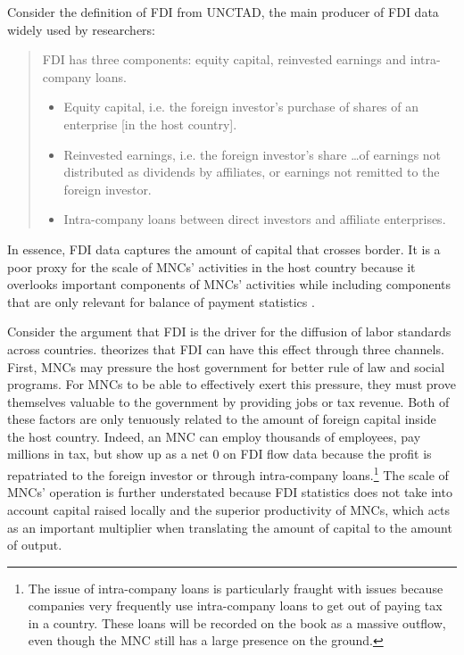 Consider the definition of FDI from UNCTAD, the main producer of FDI data widely
used by researchers:

\begin{quote} FDI has three components: equity capital, reinvested earnings and
  intra-company loans.
  \begin{itemize}
  \item Equity capital, i.e. the foreign investor’s purchase of shares of an
    enterprise [in the host country].
  \item Reinvested earnings, i.e. the foreign investor’s share \ldots of
    earnings not distributed as dividends by affiliates, or earnings not
    remitted to the foreign investor.
  \item Intra-company loans between direct investors and affiliate enterprises.
  \end{itemize} \citep[245]{UNCTAD2007}
\end{quote}

In essence, FDI data captures the amount of capital that crosses border. It is a
poor proxy for the scale of MNCs' activities in the host country because it
overlooks important components of MNCs' activities while including components
that are only relevant for balance of payment statistics
\citep{Beugelsdijk2010}.

Consider the argument that FDI is the driver for the diffusion of labor
standards across countries. \citet{Mosley2007} theorizes that FDI can have this
effect through three channels. First, MNCs may pressure the host government for
better rule of law and social programs. For MNCs to be able to effectively exert
this pressure, they must prove themselves valuable to the government by
providing jobs or tax revenue. Both of these factors are only tenuously related
to the amount of foreign capital inside the host country. Indeed, an MNC can
employ thousands of employees, pay millions in tax, but show up as a net 0 on
FDI flow data because the profit is repatriated to the foreign investor or
through intra-company loans.\footnote{The issue of intra-company loans is
  particularly fraught with issues because companies very frequently use
  intra-company loans to get out of paying tax in a country. These loans will be
  recorded on the book as a massive outflow, even though the MNC still has a
  large presence on the ground.} The scale of MNCs' operation is further
understated because FDI statistics does not take into account capital raised
locally and the superior productivity of MNCs, which acts as an important
multiplier when translating the amount of capital to the amount of output.

